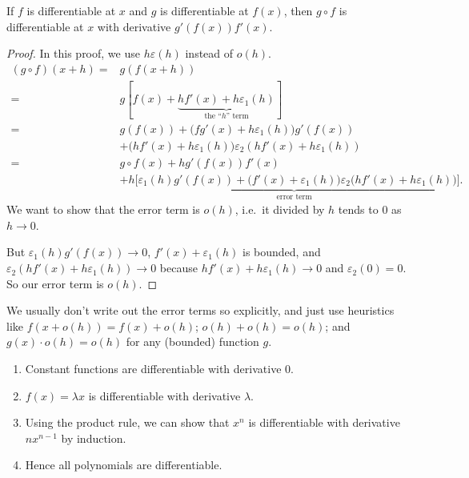 \documentclass[a4paper]{article}
\begin{document}
\begin{lemma}
  If $f$ is differentiable at $x$ and $g$ is differentiable at $f(x)$, then $g\circ f$ is differentiable at $x$ with derivative $g'(f(x))f'(x)$.
\end{lemma}

\begin{proof}
  In this proof, we use $h\varepsilon(h)$ instead of $o(h)$.
  \begin{align*}
    (g\circ f)(x + h) ={}& g(f(x + h))\\
    ={}& g[f(x) + \underbrace{hf'(x) + h\varepsilon_1(h)}_{\text{the ``}h\text{'' term}}]\\
    ={}& g(f(x)) + \big(fg'(x) + h\varepsilon_1(h)\big)g'(f(x))\\
    &+ \big(hf'(x) + h\varepsilon_1(h)\big)\varepsilon_2(hf'(x) + h\varepsilon_1(h))\\
    ={}& g\circ f(x) + hg'(f(x))f'(x)\\
    &+ \underbrace{h\Big[\varepsilon_1(h)g'(f(x)) + \big(f'(x) + \varepsilon_1(h)\big)\varepsilon_2\big(hf'(x) + h\varepsilon_1(h)\big)\Big]}_{\text{error term}}.
  \end{align*}
  We want to show that the error term is $o(h)$, i.e.\ it divided by $h$ tends to $0$ as $h\to 0$.

  But $\varepsilon_1(h)g'(f(x))\to 0$, $f'(x) + \varepsilon_1(h)$ is bounded, and $\varepsilon_2(hf'(x) + h\varepsilon_1(h))\to 0$ because $hf'(x) + h\varepsilon_1(h) \to 0$ and $\varepsilon_2(0) = 0$. So our error term is $o(h)$.
\end{proof}

We usually don't write out the error terms so explicitly, and just use heuristics like $f(x + o(h)) = f(x) + o(h)$; $o(h) + o(h) = o(h)$; and $g(x) \cdot o(h) = o(h)$ for any (bounded) function $g$.

\begin{eg}\leavevmode
  \begin{enumerate}
    \item Constant functions are differentiable with derivative $0$.
    \item $f(x) = \lambda x$ is differentiable with derivative $\lambda$.
    \item Using the product rule, we can show that $x^n$ is differentiable with derivative $nx^{n - 1}$ by induction.
    \item Hence all polynomials are differentiable.
  \end{enumerate}
\end{eg}
\end{document}
